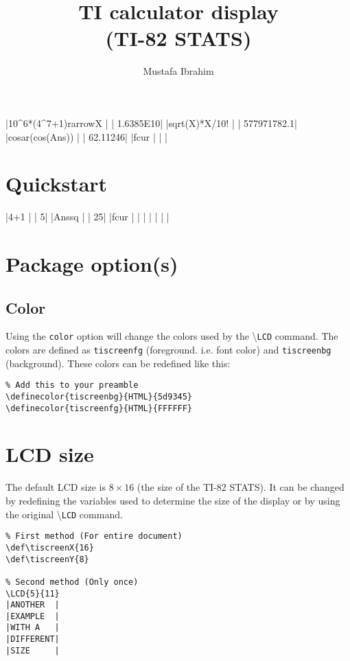 \documentclass[a4paper,12pt]{article}
\title{TI calculator display\\{\small(TI-82 STATS)}}
\author{Mustafa Ibrahim}
\newcommand{\LCDcmd}{\textbackslash\texttt{LCD}\xspace}
\begin{document}
\maketitle
\begin{center}
\tiscreen
|10^6*(4^7+1){rarrow}X  |
|       1.6385E10|
|{sqrt}(X)*X/10!      |
|     577971782.1|
|cos{ar}(cos(Ans))  |
|        62.11246|
|{fcur}               |
|                |
\end{center}
\tableofcontents
\newpage

\section{Quickstart}

\begin{SideBySideExample}[xrightmargin=6cm]

\tiscreen
|4+1             |
|               5|
|Ans{sq}         |
|              25|
|{fcur}          |
|                |
|                |
|                |
\end{SideBySideExample}


\section{Package option(s)}
\subsection{Color}
Using the \texttt{color} option will change the colors used by the \LCDcmd
command. The colors are defined as \texttt{tiscreenfg} (foreground. i.e. font
color) and \texttt{tiscreenbg} (background). These colors can be redefined like
this:

\begin{Verbatim}
% Add this to your preamble
\definecolor{tiscreenbg}{HTML}{5d9345}
\definecolor{tiscreenfg}{HTML}{FFFFFF}
\end{Verbatim}

\section{LCD size}
The default LCD size is $8\times 16$ (the size of the TI-82
STATS). It can be changed by redefining the variables used to
determine the size of the display or by using the original
\LCDcmd command.

\begin{Verbatim}
% First method (For entire document)
\def\tiscreenX{16}
\def\tiscreenY{8}

% Second method (Only once)
\LCD{5}{11}
|ANOTHER  |
|EXAMPLE  |
|WITH A   |
|DIFFERENT|
|SIZE     |
\end{Verbatim}
\end{document}
